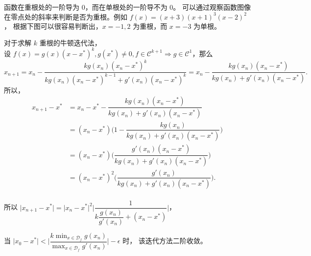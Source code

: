\documentclass[lang=cn,a4paper,newtx,bibend=bibtex]{elegantpaper}
\begin{document}
\begin{solution}
函数在重根处的一阶导为 $0$，而在单根处的一阶导不为 $0$。
可以通过观察函数图像在零点处的斜率来判断是否为重根。例如 $f(x) = (x+3)(x+1)^3(x-2)^2$ ，
根据下图可以很容易判断出，$x=-1,2$ 为重根，而 $x=-3$ 为单根。
\begin{center}
\end{center}
\end{solution}


对于求解 $k$ 重根的牛顿迭代法，\\

设 $f(x)=g(x)(x-x^*)^k, g(x^*) \neq 0, f\in \mathcal{C}^{k+1} \Rightarrow g\in \mathcal{C}^1$，那么
\[
    x_{n+1} = x_n - \dfrac{kg(x_n)(x_n-x^*)^k}{kg(x_n)(x_n-x^*)^{k-1}+g'(x_n)(x_n-x^*)^k}
    = x_n - \dfrac{kg(x_n)(x_n-x^*)}{kg(x_n)+g'(x_n)(x_n-x^*)}.
\]
所以，
\begin{equation*}
    \begin{aligned}
        x_{n+1} - x^* &= x_n - x^* -  \dfrac{kg(x_n)(x_n-x^*)}{kg(x_n)+g'(x_n)(x_n-x^*)} \\
                      &= (x_n - x^*) \bigg(1 -  
                        \dfrac{kg(x_n)}{kg(x_n)+g'(x_n)(x_n-x^*)}
                        \bigg) \\
                    &= (x_n - x^*) \bigg(
                    \dfrac{g'(x_n)(x_n-x^*)}{kg(x_n)+g'(x_n)(x_n-x^*)}
                    \bigg) \\
                    &= (x_n - x^*)^2 \bigg(
                        \dfrac{g'(x_n)}{kg(x_n)+g'(x_n)(x_n-x^*)}
                        \bigg). \\
    \end{aligned}
\end{equation*}

所以 $\vert x_{n+1} - x^*\vert = \vert x_n - x^*\vert^2 \bigg\vert 
\dfrac{1}{k\dfrac{g(x_n)}{g'(x_n)} + (x_n - x^*)}
\bigg\vert$，

当 $\vert x_0-x^* \vert < \bigg\vert\dfrac{k\min_{x\in \mathcal{D}_f}{g(x_n)}}{\max_{x\in \mathcal{D}_f}{g'(x_n)}}\bigg\vert - \epsilon$ 时，
该迭代方法二阶收敛。




\end{document}
